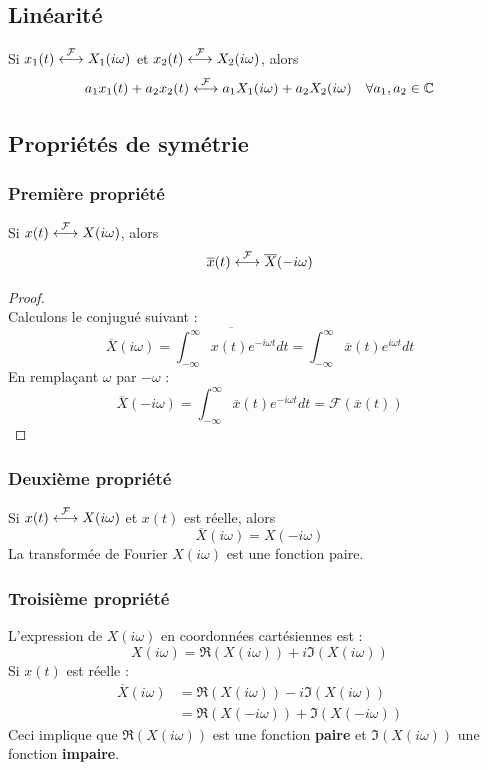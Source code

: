 	\subsection{Linéarité}
	Si $x_1(t) \ft X_1(i\omega)$ et $x_2(t) \ft X_2(i\omega)$, alors 
	\begin{equation}
	a_1x_1(t) + a_2x_2(t) \ft a_1X_1(i\omega) + a_2X_2(i\omega)\ \ \
	\forall a_1,a_2 \in \mathbb{C}
	\end{equation}
	
	\subsection{Propriétés de symétrie}
		\subsubsection{Première propriété}
		Si $x(t) \ft X(i\omega)$, alors
		\begin{equation}
		\overline{x}(t) \ft \overline{X}(-i\omega)
		\end{equation}	
		\begin{proof}\ \\
		Calculons le conjugué suivant :
		\begin{equation}
		\overline{X}(i\omega) = \overline{\int_{-\infty}^\infty x(t)e^{-
		i\omega t}dt} = \int_{-\infty}^\infty \overline{x}(t)e^{i\omega t}dt
		\end{equation}	
		En remplaçant $\omega$ par $-\omega$ :
		\begin{equation}
		\overline{X}(-i\omega) = \int_{-\infty}^\infty \overline{x}(t)e^{-i
		\omega t}dt = \mathcal{F}(\overline{x}(t))
		\end{equation}
		\end{proof}
	
		\subsubsection{Deuxième propriété}
		Si $x(t) \ft X(i\omega)$ et $x(t)$ est réelle, alors 	
		\begin{equation}
		\overline{X}(i\omega) = X(-i\omega)
		\end{equation}
		La transformée de Fourier $X(i\omega)$ est une fonction paire.
	
		\subsubsection{Troisième propriété}
		L'expression de $X(i\omega)$ en coordonnées cartésiennes est : 
		\begin{equation}
		X(i\omega) = \Re(X(i\omega)) + i\Im(X(i\omega))
		\end{equation}
		Si $x(t)$ est réelle :
		\begin{equation}
		\begin{array}{ll}
		\overline{X}(i\omega) &= \Re(X(i\omega))-i\Im
		(X(i\omega))\\
		&= \Re(X(-i\omega)) + \Im(X(-i\omega))
		\end{array}
		\end{equation}
		Ceci implique que $\Re(X(i\omega))$ est une fonction 
		\textbf{paire} et $\Im(X(i\omega))$ une fonction 
		\textbf{impaire}.
	
